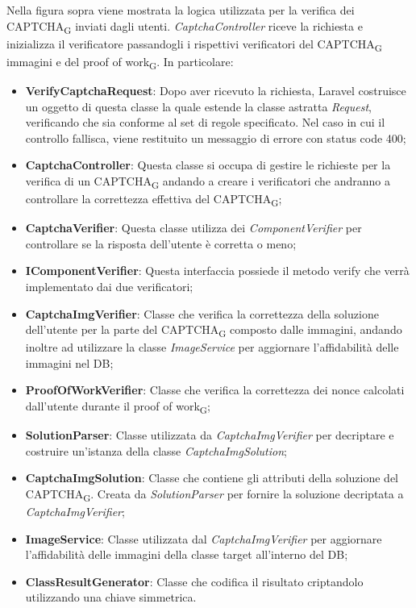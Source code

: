 Nella figura sopra viene mostrata la logica utilizzata per la verifica dei CAPTCHA\textsubscript{G} inviati dagli utenti. \textit{CaptchaController} riceve la richiesta e inizializza il verificatore passandogli i rispettivi verificatori del CAPTCHA\textsubscript{G} immagini e del proof of work\textsubscript{G}.
In particolare:
\begin{itemize}
	\item \textbf{VerifyCaptchaRequest}: Dopo aver ricevuto la richiesta, Laravel costruisce un oggetto di questa classe la quale estende la classe astratta \textit{Request}, verificando che sia conforme al set di regole specificato. Nel caso in cui il controllo fallisca, viene restituito un messaggio di errore con status code 400;
	\item \textbf{CaptchaController}: Questa classe si occupa di gestire le richieste per la verifica di un CAPTCHA\textsubscript{G} andando a creare i verificatori che andranno a controllare la correttezza effettiva del CAPTCHA\textsubscript{G};
	\item \textbf{CaptchaVerifier}: Questa classe utilizza dei \textit{ComponentVerifier} per controllare se la risposta dell'utente è corretta o meno;
	\item \textbf{IComponentVerifier}: Questa interfaccia possiede il metodo verify che verrà implementato dai due verificatori; 
	\item \textbf{CaptchaImgVerifier}: Classe che verifica la correttezza della soluzione dell'utente per la parte del CAPTCHA\textsubscript{G} composto dalle immagini, andando inoltre ad utilizzare la classe \textit{ImageService} per aggiornare l'affidabilità delle immagini nel DB;
	\item \textbf{ProofOfWorkVerifier}: Classe che verifica la correttezza dei nonce calcolati dall'utente durante il proof of work\textsubscript{G};
	\item \textbf{SolutionParser}: Classe utilizzata da \textit{CaptchaImgVerifier} per decriptare e costruire un'istanza della classe \textit{CaptchaImgSolution};
	\item \textbf{CaptchaImgSolution}: Classe che contiene gli attributi della soluzione del CAPTCHA\textsubscript{G}. Creata da \textit{SolutionParser} per fornire la soluzione decriptata a \textit{CaptchaImgVerifier};
	\item \textbf{ImageService}: Classe utilizzata dal \textit{CaptchaImgVerifier} per aggiornare l'affidabilità delle immagini della classe target all'interno del DB;
	\item \textbf{ClassResultGenerator}: Classe che codifica il risultato criptandolo utilizzando una chiave simmetrica.
\end{itemize}

